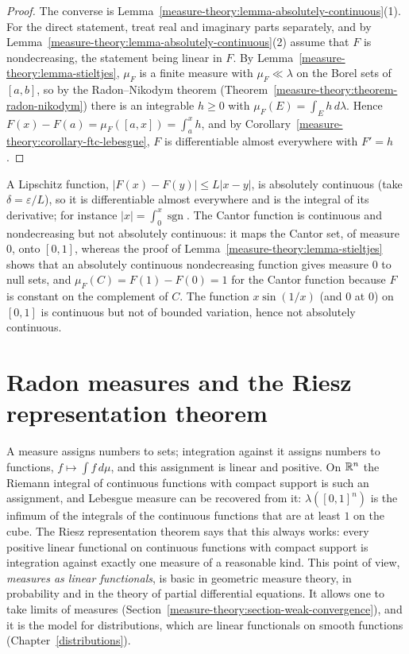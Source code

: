 \begin{proof}
The converse is Lemma~\ref{measure-theory:lemma-absolutely-continuous}(1). For the direct statement, treat real and imaginary parts separately, and by
Lemma~\ref{measure-theory:lemma-absolutely-continuous}(2) assume that $F$ is nondecreasing, the statement being linear in $F$. By
Lemma~\ref{measure-theory:lemma-stieltjes}, $\mu_F$ is a finite measure with $\mu_F \ll \lambda$ on the Borel sets of $[a, b]$, so by the Radon--Nikodym theorem
(Theorem~\ref{measure-theory:theorem-radon-nikodym}) there is an integrable $h \geq 0$ with $\mu_F(E) = \int_Eh\,d\lambda$. Hence $F(x) - F(a) = \mu_F([a, x]) = \int_a^xh$, and by
Corollary~\ref{measure-theory:corollary-ftc-lebesgue}, $F$ is differentiable almost everywhere with $F' = h$.
\end{proof}

\begin{example}\label{measure-theory:example-absolutely-continuous}
A Lipschitz function, $|F(x) - F(y)| \leq L|x - y|$, is absolutely continuous (take $\delta = \varepsilon/L$), so it is differentiable almost everywhere and is the integral of its
derivative; for instance $|x| = \int_0^x\operatorname{sgn}$. The Cantor function is continuous and nondecreasing but not absolutely continuous: it maps the Cantor set, of measure
$0$, onto $[0, 1]$, whereas the proof of Lemma~\ref{measure-theory:lemma-stieltjes} shows that an absolutely continuous nondecreasing function gives measure $0$ to null sets, and
$\mu_F(C) = F(1) - F(0) = 1$ for the Cantor function because $F$ is constant on the complement of $C$. The function $x\sin(1/x)$ (and $0$ at $0$) on $[0, 1]$ is continuous but not
of bounded variation, hence not absolutely continuous.
\end{example}


\section{Radon measures and the Riesz representation theorem}\label{measure-theory:section-radon}

A measure assigns numbers to sets; integration against it assigns numbers to functions, $f \mapsto \int f\,d\mu$, and this assignment is linear and positive. On $\mathbb{R}^n$ the
Riemann integral of continuous functions with compact support is such an assignment, and Lebesgue measure can be recovered from it: $\lambda([0, 1]^n)$ is the infimum of the integrals of the
continuous functions that are at least $1$ on the cube. The Riesz representation theorem says that this always works: every positive linear functional on continuous functions with compact support
is integration against exactly one measure of a reasonable kind. This point of view, \emph{measures as linear functionals}, is basic in geometric measure theory, in probability and in the theory
of partial differential equations. It allows one to take limits of measures (Section~\ref{measure-theory:section-weak-convergence}), and it is the model for distributions, which are linear functionals on
smooth functions (Chapter~\ref{distributions}).


